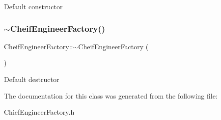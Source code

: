 Default constructor \mbox{\label{classCheifEngineerFactory_ac6c5623874406c88cd34badb6294c998}} 
\subsubsection{\texorpdfstring{$\sim$\+Cheif\+Engineer\+Factory()}{~CheifEngineerFactory()}}
{\footnotesize\ttfamily Cheif\+Engineer\+Factory\+::$\sim$\+Cheif\+Engineer\+Factory (\begin{DoxyParamCaption}{ }\end{DoxyParamCaption})}

Default destructor 

The documentation for this class was generated from the following file\+:\begin{DoxyCompactItemize}
\item 
Chief\+Engineer\+Factory.\+h\end{DoxyCompactItemize}
